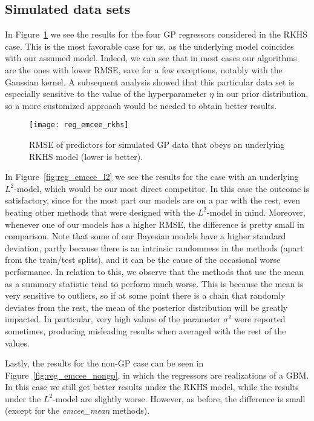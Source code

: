 \subsection*{Simulated data sets}

In Figure~\ref{fig:reg_emcee_rkhs} we see the results for the four GP regressors considered in the RKHS case. This is the most favorable case for us, as the underlying model coincides with our assumed model. Indeed, we can see that in most cases our algorithms are the ones with lower RMSE, save for a few exceptions, notably with the Gaussian kernel. A subsequent analysis showed that this particular data set is especially sensitive to the value of the hyperparameter \(\eta\) in our prior distribution, so a more customized approach would be needed to obtain better results.

\vspace{.3em}

\begin{figure}[ht!]
  \centering
  \texttt{[image: reg\_emcee\_rkhs]}
  \caption{RMSE of predictors for simulated GP data that obeys an underlying RKHS model (lower is better).}\label{fig:reg_emcee_rkhs}
\end{figure}

In Figure~\ref{fig:reg_emcee_l2} we see the results for the case with an underlying \(L^2\)-model, which would be our most direct competitor. In this case the outcome is satisfactory, since for the most part our models are on a par with the rest, even beating other methods that were designed with the \(L^2\)-model in mind. Moreover, whenever one of our models has a higher RMSE, the difference is pretty small in comparison. Note that some of our Bayesian models have a higher standard deviation, partly because there is an intrinsic randomness in the methods (apart from the train/test splits), and it can be the cause of the occasional worse performance. In relation to this, we observe that the methods that use the mean as a summary statistic tend to perform much worse. This is because the mean is very sensitive to outliers, so if at some point there is a chain that randomly deviates from the rest, the mean of the posterior distribution will be greatly impacted. In particular, very high values of the parameter \(\sigma^2\) were reported sometimes, producing misleading results when averaged with the rest of the values.

\enlargethispage{1\baselineskip}

Lastly, the results for the non-GP case can be seen in Figure~\ref{fig:reg_emcee_nongp}, in which the regressors are realizations of a GBM. In this case we still get better results under the RKHS model, while the results under the \(L^2\)-model are slightly worse. However, as before, the difference is small (except for the \textit{emcee\_mean} methods).

